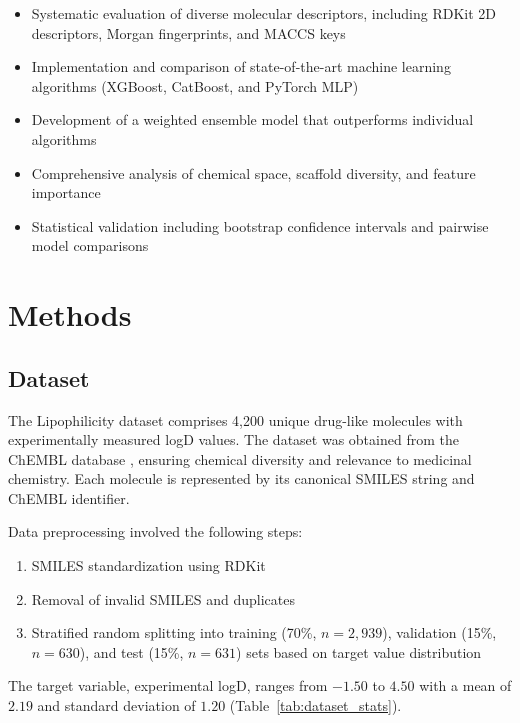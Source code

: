 \documentclass[12pt,a4paper]{article}
\begin{document}
\begin{itemize}
    \item Systematic evaluation of diverse molecular descriptors, including RDKit 2D descriptors, Morgan fingerprints, and MACCS keys
    \item Implementation and comparison of state-of-the-art machine learning algorithms (XGBoost, CatBoost, and PyTorch MLP)
    \item Development of a weighted ensemble model that outperforms individual algorithms
    \item Comprehensive analysis of chemical space, scaffold diversity, and feature importance
    \item Statistical validation including bootstrap confidence intervals and pairwise model comparisons
\end{itemize}

\section{Methods}

\subsection{Dataset}

The Lipophilicity dataset \citep{wu2018moleculenet} comprises 4,200 unique drug-like molecules with experimentally measured logD values. The dataset was obtained from the ChEMBL database \citep{gaulton2017chembl}, ensuring chemical diversity and relevance to medicinal chemistry. Each molecule is represented by its canonical SMILES string and ChEMBL identifier.

Data preprocessing involved the following steps:
\begin{enumerate}
    \item SMILES standardization using RDKit \citep{landrum2016rdkit}
    \item Removal of invalid SMILES and duplicates
    \item Stratified random splitting into training (70\%, $n=2,939$), validation (15\%, $n=630$), and test (15\%, $n=631$) sets based on target value distribution
\end{enumerate}

The target variable, experimental logD, ranges from $-1.50$ to $4.50$ with a mean of $2.19$ and standard deviation of $1.20$ (Table~\ref{tab:dataset_stats}).
\end{document}
